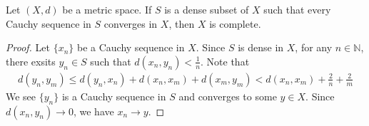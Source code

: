 \documentclass{report}
\begin{document}
\begin{lemma}{}{}
	Let $(X, d)$ be a metric space. If $S$ is a dense subset of $X$ such that every Cauchy sequence in $S$ converges in $X$, then $X$ is complete.
\end{lemma}
\begin{proof}
	Let $\{x_n\}$ be a Cauchy sequence in $X$. Since $S$ is dense in $X$, for any $n\in\mathbb{N}$, there exsits $y_n\in S$ such that $d(x_n,y_n)<\frac{1}{n}$. Note that
	\begin{align*}
		d(y_n,y_m)\le d(y_n,x_n)+d(x_n,x_m)+d(x_m,y_m)<d(x_n,x_m)+\frac{2}{n}+\frac{2}{m}
	\end{align*}
	We see $\{y_n\}$ is a Cauchy sequence in $S$ and converges to some $y\in X$. Since $d(x_n,y_n)\to 0$, we have $x_n\to y$.
\end{proof}
\end{document}
